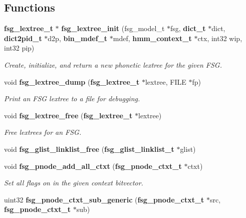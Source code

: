 \subsection*{Functions}
\begin{DoxyCompactItemize}
\item 
{\bf fsg\+\_\+lextree\+\_\+t} $\ast$ {\bf fsg\+\_\+lextree\+\_\+init} (fsg\+\_\+model\+\_\+t $\ast$fsg, {\bf dict\+\_\+t} $\ast$dict, {\bf dict2pid\+\_\+t} $\ast$d2p, {\bf bin\+\_\+mdef\+\_\+t} $\ast$mdef, {\bf hmm\+\_\+context\+\_\+t} $\ast$ctx, int32 wip, int32 pip)\label{fsg__lextree_8c_a8c47b2983b3952886a4c889a711e1d65}

\begin{DoxyCompactList}\small\item\em Create, initialize, and return a new phonetic lextree for the given F\+S\+G. \end{DoxyCompactList}\item 
void {\bf fsg\+\_\+lextree\+\_\+dump} ({\bf fsg\+\_\+lextree\+\_\+t} $\ast$lextree, F\+I\+L\+E $\ast$fp)\label{fsg__lextree_8c_a5c267f09b8dc214dd7deb41232d84726}

\begin{DoxyCompactList}\small\item\em Print an F\+S\+G lextree to a file for debugging. \end{DoxyCompactList}\item 
void {\bf fsg\+\_\+lextree\+\_\+free} ({\bf fsg\+\_\+lextree\+\_\+t} $\ast$lextree)\label{fsg__lextree_8c_a2f1ab965df1214f4d0e2008833aa20da}

\begin{DoxyCompactList}\small\item\em Free lextrees for an F\+S\+G. \end{DoxyCompactList}\item 
void {\bfseries fsg\+\_\+glist\+\_\+linklist\+\_\+free} ({\bf fsg\+\_\+glist\+\_\+linklist\+\_\+t} $\ast$glist)\label{fsg__lextree_8c_a3931da8d9c5b2709c58755d5f15faaf5}

\item 
void {\bf fsg\+\_\+pnode\+\_\+add\+\_\+all\+\_\+ctxt} ({\bf fsg\+\_\+pnode\+\_\+ctxt\+\_\+t} $\ast$ctxt)\label{fsg__lextree_8c_a98fd94d024df264025e30c909c82cb56}

\begin{DoxyCompactList}\small\item\em Set all flags on in the given context bitvector. \end{DoxyCompactList}\item 
uint32 {\bf fsg\+\_\+pnode\+\_\+ctxt\+\_\+sub\+\_\+generic} ({\bf fsg\+\_\+pnode\+\_\+ctxt\+\_\+t} $\ast$src, {\bf fsg\+\_\+pnode\+\_\+ctxt\+\_\+t} $\ast$sub)\label{fsg__lextree_8c_aa9ff81fb4f5d873188fcf3be3f5fc18e}


\end{DoxyCompactItemize}
